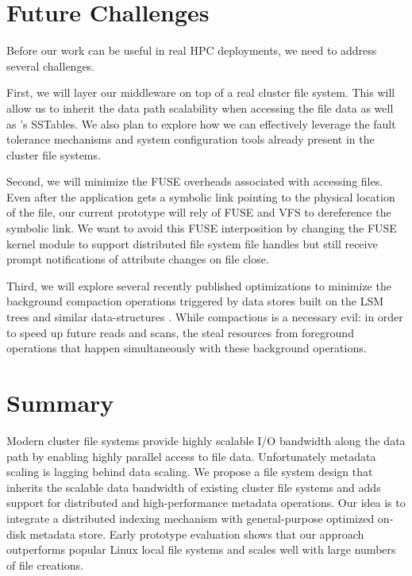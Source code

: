 \section{Future Challenges}
\label{futurework}

Before our work can be useful in real HPC deployments, we need to address
several challenges.

First, we will layer our middleware on top of a real cluster file system.
This will allow us to inherit the data path scalability when accessing the 
file data as well as \ldb's SSTables. We also plan to explore how
we can effectively leverage the fault tolerance mechanisms and system
configuration tools already present in the cluster file systems.

Second, we will minimize the FUSE overheads associated with accessing files.
Even after the application gets a symbolic link pointing to the physical
location of the file, our current prototype will rely of FUSE and VFS to
dereference the symbolic link. We want to avoid this FUSE
interposition by changing the FUSE kernel module to support distributed file
system file handles but still receive prompt notifications of attribute changes
on file close.

Third, we will explore several recently published optimizations to minimize the
background compaction operations triggered by data stores built on the LSM
trees and similar data-structures \citep{blsm, tokufs, Bender2007}. 
While compactions is a necessary evil: in order to speed up future reads and
scans, the steal resources from foreground operations that happen
simultaneously with these background operations.

\section{Summary}
\label{summary}

Modern cluster file systems provide highly scalable I/O bandwidth along the
data path by enabling highly parallel access to file data.
Unfortunately metadata scaling is lagging behind data scaling.
We propose a file system design that 
inherits the scalable data bandwidth of existing cluster file systems
and adds support for distributed and high-performance metadata operations.
Our idea is to integrate a distributed indexing mechanism with general-purpose
optimized on-disk metadata store.
Early prototype evaluation shows that our approach outperforms popular Linux
local file systems and scales well with large numbers of file creations. 




